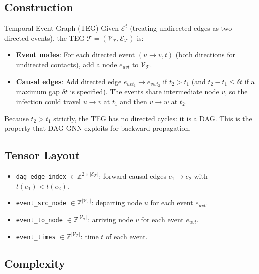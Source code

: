 \documentclass[12pt,a4paper]{report}
\newcommand{\calV}{\mathcal{V}}
\newcommand{\calE}{\mathcal{E}}
\begin{document}
\subsection{Construction}

\begin{definition}{Temporal Event Graph (TEG)}
Given $\calE^t$ (treating undirected edges as two directed events), the TEG
$\mathcal{T} = (\calV_\mathcal{T}, \calE_\mathcal{T})$ is:
\begin{itemize}
  \item \textbf{Event nodes}: For each directed event $(u \to v, t)$ (both
    directions for undirected contacts), add a node $e_{uvt}$ to $\calV_\mathcal{T}$.
  \item \textbf{Causal edges}: Add directed edge $e_{uvt_1} \to e_{vwt_2}$ if
    $t_2 > t_1$ (and $t_2 - t_1 \leq \delta t$ if a maximum gap $\delta t$ is
    specified). The events share intermediate node $v$, so the infection could
    travel $u \to v$ at $t_1$ and then $v \to w$ at $t_2$.
\end{itemize}
\end{definition}

Because $t_2 > t_1$ strictly, the TEG has no directed cycles: it is a DAG.
This is the property that DAG-GNN exploits for backward propagation.

\subsection{Tensor Layout}

\begin{itemize}[noitemsep]
  \item \texttt{dag\_edge\_index} $\in \mathbb{Z}^{2 \times |\calE_\mathcal{T}|}$:
    forward causal edges $e_1 \to e_2$ with $t(e_1) < t(e_2)$.
  \item \texttt{event\_src\_node} $\in \mathbb{Z}^{|\calV_\mathcal{T}|}$:
    departing node $u$ for each event $e_{uvt}$.
  \item \texttt{event\_to\_node} $\in \mathbb{Z}^{|\calV_\mathcal{T}|}$:
    arriving node $v$ for each event $e_{uvt}$.
  \item \texttt{event\_times} $\in \mathbb{Z}^{|\calV_\mathcal{T}|}$: time $t$
    of each event.
\end{itemize}

\subsection{Complexity}
\end{document}
